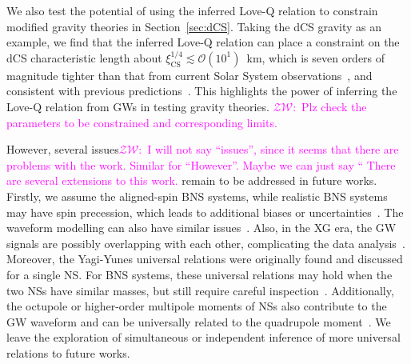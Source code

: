 \documentclass[a4paper,11pt]{article}
\newcommand{\ZW}[1]{\textcolor{magenta}{$\mathcal{ZW}$:~#1}}
\begin{document}
We also test the potential of using the inferred Love-Q relation to
constrain modified gravity theories in Section~\ref{sec:dCS}.
Taking the dCS gravity as an example, we find that the inferred Love-Q relation
can place a constraint on the dCS characteristic length about
$\xi_{\mathrm{CS}}^{1/4} \lesssim \mathcal{O}(10^1)$~km, which is seven orders
of magnitude tighter than that from current Solar System
observations~\cite{Ali-Haimoud:2011zme,Yagi:2012ya}, and consistent with
previous predictions~\cite{Yagi:2013bca,Yagi:2013awa}. This highlights the power
of inferring the Love-Q relation from GWs in testing gravity theories. \ZW{Plz
check the parameters to be constrained and corresponding limits.}

However, several issues\ZW{I will not say ``issues'', since it seems that there
are problems with the work. Similar for ``However''. Maybe we can just say ``
There are several
extensions to this work.
} remain to be addressed in future works. Firstly, we assume the aligned-spin
BNS systems, while
realistic BNS systems may have spin precession, which leads to additional
biases or uncertainties~\cite{Williamson:2017evr}. The waveform modelling can
also have similar issues~\cite{Purrer:2019jcp,Gamba:2020wgg}. 
Also, in the XG era, the GW signals are possibly overlapping with each
other, complicating the data analysis~\cite{Pizzati:2021apa, Samajdar:2021egv,
Wang:2023ldq, Johnson:2024foj, Wang:2025ckw}.
Moreover, the Yagi-Yunes universal relations were originally found and discussed
for a single NS. For BNS systems, these universal relations may hold when the
two NSs have similar masses, but still require careful
inspection~\cite{Shao:2022koz, Saffer:2021gak}. Additionally, the octupole or
higher-order multipole moments of NSs also contribute to the GW waveform and can
be universally related to the quadrupole moment~\cite{Yagi_2017,Abac:2023ujg}.
We leave the exploration of simultaneous or independent inference of more
universal relations to future works.

\acknowledgments

\clearpage


% 

\end{document}

